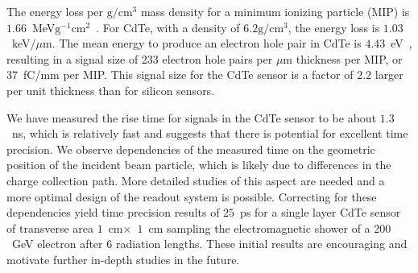 \documentclass[preprint,1p]{elsarticle}
\begin{document}
The energy loss per $\mathrm{g}/\mathrm{cm}^{3}$ mass density 
for a minimum ionizing particle (MIP) is $1.66$~MeV$\mathrm{g}^{-1}\mathrm{cm}^{2}$~\cite{PDG}. 
For CdTe, with a density of $6.2\mathrm{g}/\mathrm{cm}^{3}$, the energy
loss is $1.03$~keV/$\mu$m. The mean energy to produce an electron hole pair
in CdTe is $4.43$~eV~\cite{Sze,Singh}, resulting in a signal size of
233 electron hole pairs per $\mu$m thickness per MIP, or $37$~fC/mm per
MIP. This signal size for the CdTe sensor is a factor of $2.2$ larger per unit thickness
than for silicon sensors. 




We have measured the rise time for signals in the CdTe sensor to be about $1.3$~ns, which
is relatively fast and suggests that there is potential for excellent time precision.
We observe dependencies of the measured time on the geometric position of the
incident beam particle, which is likely due to differences in the charge collection
path. More detailed studies of this aspect are needed and a more optimal design of the 
readout system is possible. Correcting for these dependencies yield time precision results
of $25$~ps for a single layer CdTe sensor of transverse area $1$~cm$\times$~$1$~cm
sampling the electromagnetic shower of a $200$~GeV electron after $6$ radiation lengths. 
These initial results are encouraging and motivate further in-depth studies in the
future.







{}
 




\end{document}

